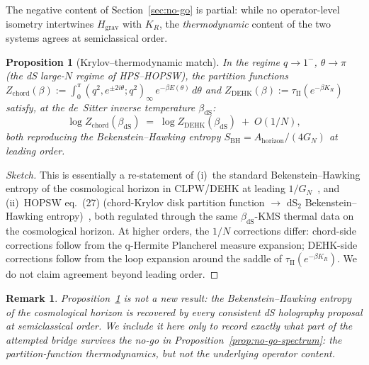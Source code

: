\documentclass[12pt,a4paper]{article}
\newtheorem{proposition}{Proposition}
\newtheorem{remark}{Remark}
\theoremstyle{definition}
\begin{document}
The negative content of Section~\ref{sec:no-go} is partial: while no
operator-level isometry intertwines $H_{\mathrm{grav}}$ with $K_R$, the
\emph{thermodynamic} content of the two systems agrees at semiclassical
order.

\begin{proposition}[Krylov--thermodynamic match]
\label{prop:therm-match}
In the regime $q\to 1^-$, $\theta\to\pi$ (the dS large-$N$ regime of
HPS--HOPSW), the partition functions
$Z_{\mathrm{chord}}(\beta) := \int_0^\pi (q^2,e^{\pm 2i\theta};q^2)_\infty\,
e^{-\beta E(\theta)}\,d\theta$ and $Z_{\mathrm{DEHK}}(\beta) :=
\tau_{\mathrm{II}}(e^{-\beta K_R})$ satisfy, at the de~Sitter inverse
temperature $\beta_{\mathrm{dS}}$:
\begin{equation}
   \log Z_{\mathrm{chord}}(\beta_{\mathrm{dS}})
   \;=\; \log Z_{\mathrm{DEHK}}(\beta_{\mathrm{dS}}) \;+\; O(1/N) ,
   \label{eq:therm-match}
\end{equation}
both reproducing the Bekenstein--Hawking entropy
$S_{\mathrm{BH}} = A_{\mathrm{horizon}}/(4 G_N)$ at leading order.
\end{proposition}

\begin{proof}[Sketch]
This is essentially a re-statement of (i)~the standard Bekenstein--Hawking
entropy of the cosmological horizon in CLPW/DEHK at leading
$1/G_N$~\cite{CLPW2023,DEHK2025a}, and (ii)~HOPSW eq.~(27) (chord-Krylov
disk partition function $\to$ dS$_2$ Bekenstein--Hawking
entropy)~\cite{HOPSW2025}, both regulated through the same
$\beta_{\mathrm{dS}}$-KMS thermal data on the cosmological horizon.
At higher orders, the $1/N$ corrections differ: chord-side corrections
follow from the q-Hermite Plancherel measure expansion; DEHK-side
corrections follow from the loop expansion around the saddle of
$\tau_{\mathrm{II}}(e^{-\beta K_R})$. We do not claim agreement beyond
leading order.
\end{proof}

\begin{remark}
Proposition~\ref{prop:therm-match} is \emph{not} a new result: the
Bekenstein--Hawking entropy of the cosmological horizon is recovered by
\emph{every} consistent dS holography proposal at semiclassical order.
We include it here only to record \emph{exactly} what part of the
attempted bridge survives the no-go in
Proposition~\ref{prop:no-go-spectrum}: the partition-function
thermodynamics, but not the underlying operator content.
\end{remark}
\end{document}

